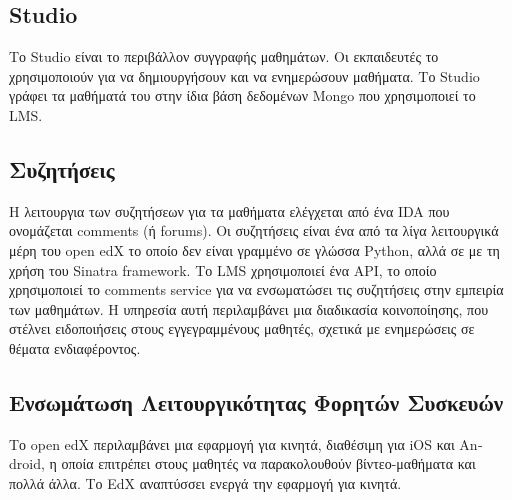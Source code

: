 \documentclass[12pt]{report}
\begin{document}
\subsection{\textlatin{Studio}}
Το Studio είναι το περιβάλλον συγγραφής μαθημάτων. Οι εκπαιδευτές το χρησιμοποιούν για να δημιουργήσουν και να ενημερώσουν μαθήματα. Το \textlatin{Studio} γράφει τα μαθήματά του στην ίδια βάση δεδομένων \textlatin{Mongo} που χρησιμοποιεί το LMS.

\subsection{Συζητήσεις}
H λειτουργια των συζητήσεων για τα μαθήματα ελέγχεται από ένα \textlatin{IDA} που ονομάζεται \textlatin{comments} (ή \textlatin{forums}). Οι συζητήσεις είναι ένα από τα λίγα λειτουργικά μέρη του \textlatin{open edX} το οποίο δεν είναι γραμμένο σε γλώσσα \textlatin{Python}, αλλά σε  με τη χρήση του \textlatin{Sinatra framework}. Το \textlatin{LMS} χρησιμοποιεί ένα \textlatin{API}, το οποίο χρησιμοποιεί το \textlatin{comments service} για να ενσωματώσει τις συζητήσεις στην εμπειρία των μαθημάτων. Η υπηρεσία αυτή περιλαμβάνει μια διαδικασία κοινοποίησης, που στέλνει ειδοποιήσεις στους εγγεγραμμένους μαθητές, σχετικά με ενημερώσεις σε θέματα ενδιαφέροντος.

\subsection{Ενσωμάτωση Λειτουργικότητας Φορητών Συσκευών} Το \textlatin{open edX} περιλαμβάνει μια εφαρμογή για κινητά, διαθέσιμη για \textlatin{iOS} και \textlatin{Android}, η οποία επιτρέπει στους μαθητές να παρακολουθούν βίντεο-μαθήματα και πολλά άλλα. Το \textlatin{EdX} αναπτύσσει ενεργά την εφαρμογή για κινητά.
\end{document}
